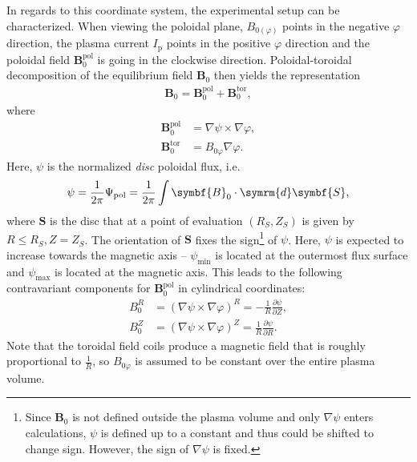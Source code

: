 \documentclass[a4paper, twoside, 10pt, english]{article}
\numberwithin{equation}{section}
\let\temp\varrho
\let\varrho\rho
\let\rho\temp
\let\temp\vartheta
\let\vartheta\theta
\let\theta\temp
\let\temp\varphi
\let\varphi\phi
\let\phi\temp
\let\vec\symbf
\newcommand*\grad{\ensuremath{\nabla}}
\newcommand*\diff{\ensuremath{\symrm{d}}}  %
\newcommand*\pd[2][]{\ensuremath{\frac{\partial #1}{\partial #2}}}  %
\newcommand*\pol{\ensuremath{\textrm{pol}}}  %
\newcommand*\tor{\ensuremath{\textrm{tor}}}  %
\begin{document}
In regards to this coordinate system, the experimental setup can be characterized. When viewing the poloidal plane, $B_{0 (\phi)}$ points in the negative $\phi$ direction, the plasma current $I_{\text{p}}$ points in the positive $\phi$ direction and the poloidal field $\vec{B}_{0}^{\pol}$ is going in the clockwise direction. Poloidal-toroidal decomposition of the equilibrium field $\vec{B}_{0}$ then yields the representation
\begin{gather}
  \vec{B}_{0} = \vec{B}_{0}^{\pol} + \vec{B}_{0}^{\tor}, \label{eq:B_pol_tor}
\end{gather}
where 
\begin{align}
  \vec{B}_{0}^{\pol} &= \grad \psi \times \grad \phi, \label{eq:B_pol} \\
  \vec{B}_{0}^{\tor} &= B_{0 \phi} \grad \phi. \label{eq:B_tor}
\end{align}
Here, $\psi$ is the normalized \emph{disc} poloidal flux, i.e.
\begin{gather}
  \psi = \frac{1}{2 \pi} \Psi_{\pol} = \frac{1}{2 \pi} \int \vec{B}_{0} \cdot \diff \vec{S},
\end{gather}
where $\vec{S}$ is the disc that at a point of evaluation $(R_{S}, Z_{S})$ is given by $R \leq R_{S}, Z = Z_{S}$. The orientation of $\vec{S}$ fixes the sign\footnote{Since $\vec{B}_{0}$ is not defined outside the plasma volume and only $\grad \psi$ enters calculations, $\psi$ is defined up to a constant and thus could be shifted to change sign. However, the sign of $\grad \psi$ is fixed.} of $\psi$. Here, $\psi$ is expected to increase towards the magnetic axis -- $\psi_{\text{min}}$ is located at the outermost flux surface and $\psi_{\text{max}}$ is located at the magnetic axis. This leads to the following contravariant components for $\vec{B}_{0}^{\pol}$ in cylindrical coordinates:
\begin{align}
  B_{0}^{R} &= (\grad \psi \times \grad \phi)^{R} = -\frac{1}{R} \pd[\psi]{Z}, \label{eq:B0R} \\
  B_{0}^{Z} &= (\grad \psi \times \grad \phi)^{Z} = \frac{1}{R} \pd[\psi]{R}. \label{eq:B0Z}
\end{align}
Note that the toroidal field coils produce a magnetic field that is roughly proportional to $\frac{1}{R}$, so $B_{0 \phi}$ is assumed to be constant over the entire plasma volume.
\end{document}
